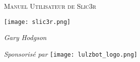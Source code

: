 \date {}
\thispagestyle{empty}
\begingroup
\centering 

\begin{center}
{\Huge \scshape Manuel Utilisateur de Slic3r}
\end{center}

\vspace{40mm}

\begin{center}
\texttt{[image: slic3r.png]}

\vspace{20mm}

{\large \itshape Gary Hodgson}

\vspace{20mm}

{\large \itshape Sponsoris\'e par }
\texttt{[image: lulzbot\_logo.png]}

\end{center}
\endgroup

